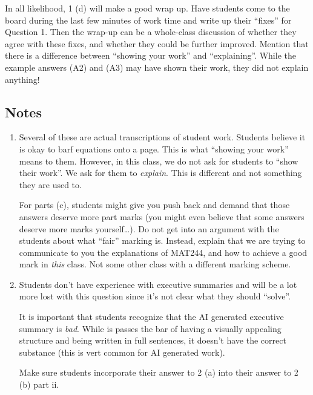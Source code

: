 In all likelihood, 1 (d) will make a good wrap up. Have students come to the board during the last few minutes of work time and 
write up their ``fixes'' for Question 1. Then the wrap-up can be a whole-class discussion of whether they agree with these fixes, and
whether they could be further improved. Mention that there is a difference between ``showing your work'' and ``explaining''. While the 
example answers (A2) and (A3) may have shown their work, they did not explain anything!

\subsection*{Notes}
\begin{enumerate}
	\item Several of these are actual transcriptions of student work. Students believe it is okay to barf equations onto a page.
	This is what ``showing your work'' means to them. However, in this class, we do not ask for students to ``show their work''.
	We ask for them to \emph{explain}. This is different and not something they are used to.
	
	For parts (c), students might give you push back and demand that those answers deserve more part marks (you might even
	believe that some answers deserve more marks yourself\ldots). Do not get into an argument with the students about what 
	``fair'' marking is. Instead, explain that we are trying to communicate to you the explanations of MAT244, and how to achieve
	a good mark in \emph{this} class. Not some other class with a different marking scheme. 
	
	\item Students don't have experience with executive summaries and will be a lot more lost with this question since it's not
	clear what they should ``solve''.

	It is important that students recognize that the AI generated executive summary is \emph{bad}. While is passes the bar of having
	a visually appealing structure and being written in full sentences, it doesn't have the correct substance (this is vert common for AI
	generated work).
	
	Make sure students incorporate their answer to 2 (a) into their answer to 2 (b) part ii.
\end{enumerate}

